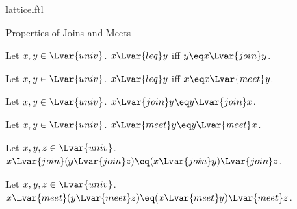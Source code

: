 \documentclass{naproche-library}
\begin{document}
\begin{smodule}[title=Lattices]{lattice.ftl}
\begin{sfragment}{Properties of Joins and Meets}
  \begin{proposition}[forthel,id=PrecedingIffJoinEqualsLargerOperandThm]
    Let $x,y\in\Lvar{univ}$.
    $x{\Lvar{leq}}y$ iff $y\eq x{\Lvar{join}}y$.
  \end{proposition}

  \begin{proposition}[forthel,id=PrecedingIffMeetEqualsLargerOperandThm]
    Let $x,y\in\Lvar{univ}$.
    $x{\Lvar{leq}}y$ iff $x\eq x{\Lvar{meet}}y$.
  \end{proposition}

  \begin{proposition}[forthel,id=JoinIsCommutativeThm]
    Let $x,y\in\Lvar{univ}$.
    $x{\Lvar{join}}y\eq y{\Lvar{join}}x$.
  \end{proposition}

  \begin{proposition}[forthel,id=MeetIsCommutativeThm]
    Let $x,y\in\Lvar{univ}$.
    $x{\Lvar{meet}}y\eq y{\Lvar{meet}}x$.
  \end{proposition}

  \begin{proposition}[forthel,id=JoinIsAssociativeThm]
    Let $x,y,z\in\Lvar{univ}$.
    $x{\Lvar{join}}(y{\Lvar{join}}z)\eq (x{\Lvar{join}}y){\Lvar{join}}z$.
  \end{proposition}

  \begin{proposition}[forthel,id=MeetIsAssociativeThm]
    Let $x,y,z\in\Lvar{univ}$.
    $x{\Lvar{meet}}(y{\Lvar{meet}}z)\eq (x{\Lvar{meet}}y){\Lvar{meet}}z$.
  \end{proposition}
\end{sfragment}
\end{smodule}
\end{document}
